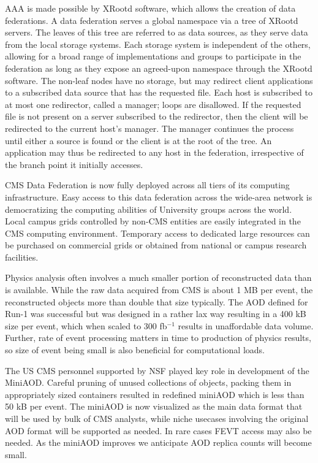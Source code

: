 \documentclass[11pt,a4paper]{article}
\begin{document}
AAA is made possible by XRootd software, which allows the creation of
data federations. A data federation serves a global namespace via a
tree of XRootd servers. The leaves of this tree are referred to as
data sources, as they serve data from the local storage systems.
Each storage system is independent of the others, allowing for a broad
range of implementations and groups to participate in the federation
as long as they expose an agreed-upon namespace through the XRootd
software. The non-leaf nodes have no storage, but may redirect client
applications to a subscribed data source that has the requested file.
Each host is subscribed to at most one redirector, called a manager;
loops are disallowed. If the requested file is not present on a server
subscribed to the redirector, then the client will be redirected to
the current host's manager.  The manager continues the process until
either a source is found or the client is at the root of the tree. An
application may thus be redirected to any host in the federation,
irrespective of the branch point it initially accesses.

CMS Data Federation is now fully deployed across all tiers of its
computing infrastructure. Easy access to this data federation across
the wide-area network is democratizing the computing abilities of
University groups across the world. Local campus grids controlled by
non-CMS entities are easily integrated in the CMS computing
environment. Temporary access to dedicated large resources can be
purchased on commercial grids or obtained from national or campus
research facilities.


Physics analysis often involves a much smaller portion of
reconstructed data than is available. While the raw data acquired from
CMS is about 1 MB per event, the reconstructed objects more than
double that size typically. The AOD defined for Run-1 was successful
but was designed in a rather lax way resulting in a 400 kB size per
event, which when scaled to 300 fb$^{-1}$ results in unaffordable
data volume. Further, rate of event processing matters in time to
production of physics results, so size of event being small is also
beneficial for computational loads. 

The US CMS personnel supported by NSF played key role in development
of the MiniAOD.  Careful pruning of unused collections of objects, packing them
in appropriately sized containers resulted in redefined miniAOD which
is less than 50 kB per event. The miniAOD is now visualized as the main data format that will
be used by bulk of CMS analysts, while niche usecases involving the
original AOD format will be supported as needed. In rare cases FEVT
access may also be needed.  As the miniAOD improves we anticipate AOD
replica counts will become small. 
\end{document}
